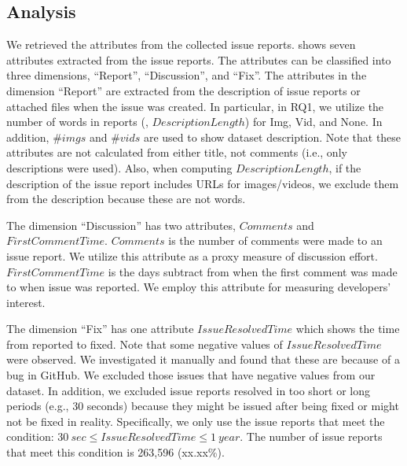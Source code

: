 % 
%

\subsection{Analysis}
We retrieved the attributes from the collected issue reports.
 shows seven attributes extracted from 
the issue reports. 
The attributes can be classified into three dimensions, 
``Report'', ``Discussion'', and ``Fix''. 
The attributes in the dimension ``Report'' are extracted from 
the description of issue reports or attached files 
when the issue was created. 
In particular, in RQ1, we 
utilize the number of words 
in reports (\ie, $DescriptionLength$) for Img, Vid, and None. 
In addition,  $\#imgs$ and $\#vids$ are used to show 
dataset description. 
Note that these attributes are not calculated from either title, not comments (i.e., only descriptions were used). 
Also, when computing $DescriptionLength$, if the description of the issue report 
includes URLs for images/videos, 
we exclude them from the description because these are not words.

The dimension ``Discussion'' has two attributes, $Comments$ and $FirstCommentTime$. $Comments$ is the number of comments were made to an issue report. We utilize this attribute as a proxy measure of discussion effort. $FirstCommentTime$ is the days subtract from when the first comment was made to when issue was reported. We employ this attribute for measuring developers' interest. 

The dimension ``Fix'' has one attribute $IssueResolvedTime$ which shows the time from reported to fixed. 
Note that some negative values of $IssueResolvedTime$ were observed. We investigated it manually and found that these are because of a bug in GitHub.  We excluded those issues that have negative values from our dataset. 
In addition, we excluded issue reports resolved in too short or long periods (e.g., 30 seconds) because they might be issued after being fixed or might not be fixed in reality.
Specifically, we only use the issue reports that meet the condition: $30\ sec \leq IssueResolvedTime \leq 1\ year$.
The number of issue reports that meet this condition is 263,596 (xx.xx\%).


